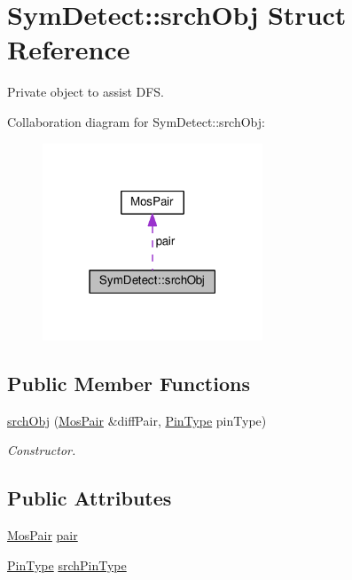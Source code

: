 \hypertarget{structSymDetect_1_1srchObj}{}\section{Sym\+Detect\+:\+:srch\+Obj Struct Reference}
\label{structSymDetect_1_1srchObj}


Private object to assist D\+FS.  




Collaboration diagram for Sym\+Detect\+:\+:srch\+Obj\+:\nopagebreak
\begin{figure}[H]
\begin{center}
\leavevmode
\includegraphics[width=186pt]{structSymDetect_1_1srchObj__coll__graph}
\end{center}
\end{figure}
\subsection*{Public Member Functions}
\begin{DoxyCompactItemize}
\item 
\hyperlink{structSymDetect_1_1srchObj_a12d3ae03e9163b5e7bc46a224022880e}{srch\+Obj} (\hyperlink{structMosPair}{Mos\+Pair} \&diff\+Pair, \hyperlink{type_8h_afaab50027002ecbb6c8ac27e727d1bb4}{Pin\+Type} pin\+Type)
\begin{DoxyCompactList}\small\item\em Constructor. \end{DoxyCompactList}\end{DoxyCompactItemize}
\subsection*{Public Attributes}
\begin{DoxyCompactItemize}
\item 
\hyperlink{structMosPair}{Mos\+Pair} \hyperlink{structSymDetect_1_1srchObj_aec9a5afaae2c8dfdf79ff4c654c73ede}{pair}
\item 
\hyperlink{type_8h_afaab50027002ecbb6c8ac27e727d1bb4}{Pin\+Type} \hyperlink{structSymDetect_1_1srchObj_ae7cd64a55ef6fa4dae853e0ff822888a}{srch\+Pin\+Type}
\end{DoxyCompactItemize}


